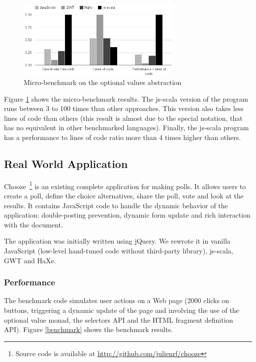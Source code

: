 \documentclass[preprint]{sigplanconf}
\begin{document}
\begin{figure}
\centering
\includegraphics[width=8cm]{microbenchmark.png}
\caption{Micro-benchmark on the optional values abstraction}
\label{micro-benchmark}
\end{figure}

Figure \ref{micro-benchmark} shows the micro-benchmark results. The js-scala version of the
program runs between 3 to 100 times than other approaches. This version also takes less lines of
code than others (this result is almost due to the special  notation, that has no
equivalent in other benchmarked languages). Finally, the js-scala program has a performance to lines
of code ratio more than 4 times higher than others.

\subsection{Real World Application}

Chooze~\footnote{Source code is available at
\href{http://github.com/julienrf/chooze}{http://github.com/julienrf/chooze}} is an existing
complete application for making polls. It allows users to create a poll, define the choice
alternatives, share the poll, vote and look at the results. It contains JavaScript code to handle
the dynamic behavior of the application: double-posting prevention, dynamic form update and rich
interaction with the document.

The application was initially written using jQuery. We rewrote it in vanilla JavaScript (low-level
hand-tuned code without third-party library), js-scala, GWT and HaXe.

\subsubsection{Performance}

The benchmark code simulates user actions on a Web page (2000 clicks on buttons, triggering a
dynamic update of the page and involving the use of the optional value monad, the selectors API and
the HTML fragment definition API). Figure \ref{benchmark} shows the benchmark results.
\end{document}
